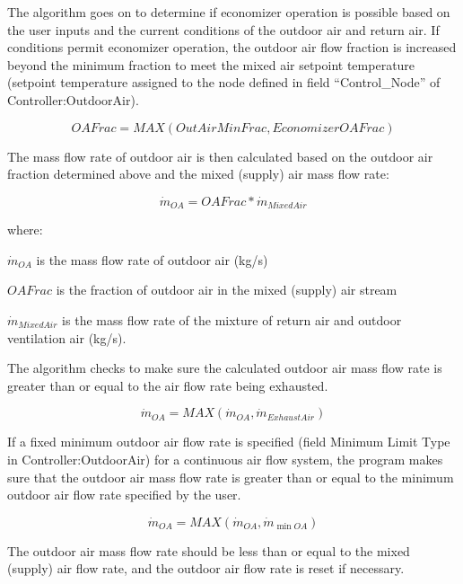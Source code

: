 The algorithm goes on to determine if economizer operation is possible based on the user inputs and the current conditions of the outdoor air and return air. If conditions permit economizer operation, the outdoor air flow fraction is increased beyond the minimum fraction to meet the mixed air setpoint temperature (setpoint temperature assigned to the node defined in field ``Control\_Node'' of Controller:OutdoorAir).

\begin{equation}
OAFrac = MAX(OutAirMinFrac,EconomizerOAFrac)
\end{equation}

The mass flow rate of outdoor air is then calculated based on the outdoor air fraction determined above and the mixed (supply) air mass flow rate:

\begin{equation}
{\dot m_{OA}} = OAFrac * {\dot m_{MixedAir}}
\end{equation}

where:

\({\dot m_{OA}}\) is the mass flow rate of outdoor air (kg/s)

\(OAFrac\) is the fraction of outdoor air in the mixed (supply) air stream

\({\dot{m}_{MixedAir}}\) is the mass flow rate of the mixture of return air and outdoor ventilation air (kg/s).

The algorithm checks to make sure the calculated outdoor air mass flow rate is greater than or equal to the air flow rate being exhausted.

\begin{equation}
{\dot m_{OA}} = MAX\left( {{{\dot m}_{OA}},{{\dot m}_{ExhaustAir}}} \right)
\end{equation}

If a fixed minimum outdoor air flow rate is specified (field Minimum Limit Type in Controller:OutdoorAir) for a continuous air flow system, the program makes sure that the outdoor air mass flow rate is greater than or equal to the minimum outdoor air flow rate specified by the user.

\begin{equation}
{\dot m_{OA}} = MAX\left( {{{\dot m}_{OA}},{{\dot m}_{\min OA}}} \right)
\end{equation}

The outdoor air mass flow rate should be less than or equal to the mixed (supply) air flow rate, and the outdoor air flow rate is reset if necessary.

